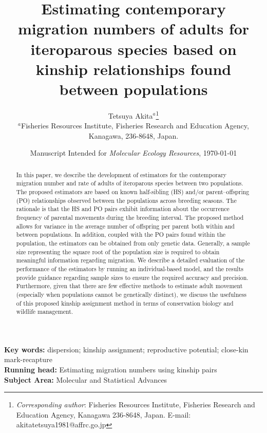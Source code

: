 \documentclass[12pt, English]{article}
\begin{document}
\title{Estimating contemporary migration numbers of adults for iteroparous species based on kinship relationships found between populations}
\author{
Tetsuya Akita$^{a}$\thanks{
\emph{Corresponding author}:
    Fisheries Resources Institute, Fisheries Research and Education Agency, Kanagawa 236-8648, Japan.
    E-mail: akitatetsuya1981@affrc.go.jp} \\ 
   \small $^{a}$Fisheries Resources Institute, Fisheries Research and Education Agency, \\
   \small Kanagawa, 236-8648, Japan.
   }
\date{Manuscript Intended for \emph{Molecular Ecology Resources}, \today}%
\maketitle

\begin{abstract}
In this paper, we describe the development of estimators for the contemporary migration number and rate of adults of iteroparous species between two populations. The proposed estimators are based on known half-sibling (HS) and/or parent--offspring (PO) relationships observed between the populations across breeding seasons. The rationale is that the HS and PO pairs exhibit information about the occurrence frequency of parental movements during the breeding interval. The proposed method allows for variance in the average number of offspring per parent both within and between populations. In addition, coupled with the PO pairs found within the population, the estimators can be obtained from only genetic data. Generally, a sample size representing the square root of the population size is required to obtain meaningful information regarding migration. We describe a detailed evaluation of the performance of the estimators by running an individual-based model, and the results provide guidance regarding sample sizes to ensure the required accuracy and precision. Furthermore, given that there are few effective methods to estimate adult movement (especially when populations cannot be genetically distinct), we discuss the usefulness of this proposed kinship assignment method in terms of conservation biology and wildlife management.  
\\
\end{abstract}
\textbf{Key words:} dispersion; kinship assignment; reproductive potential; close-kin mark-recapture\\
\textbf{Running head:} Estimating migration numbers using kinship pairs\\
\textbf{Subject Area:} Molecular and Statistical Advances\\
\end{document}
